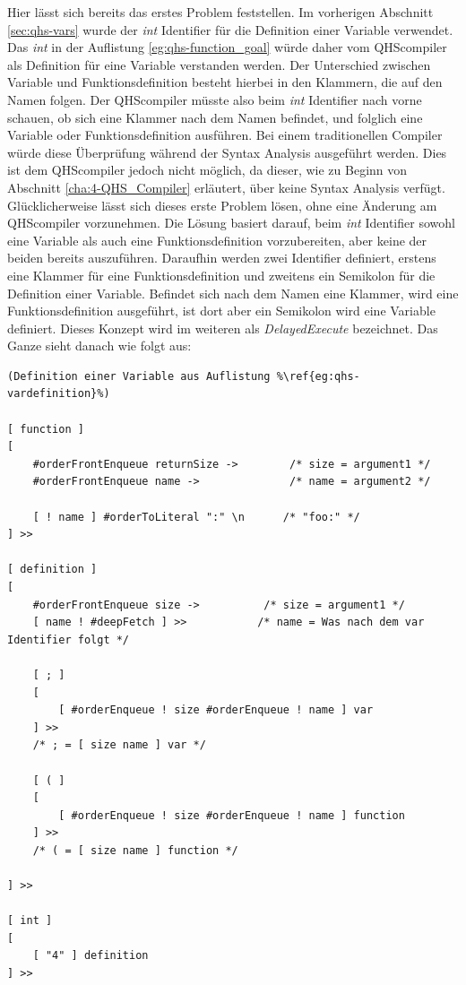 Hier lässt sich bereits das erstes Problem feststellen. Im vorherigen Abschnitt \ref{sec:qhs-vars} wurde der \textit{int} Identifier für die Definition einer Variable verwendet. 
Das \textit{int} in der Auflistung \ref{eg:qhs-function_goal} würde daher vom QHScompiler als Definition für eine Variable verstanden werden. Der Unterschied zwischen Variable und Funktionsdefinition besteht hierbei in den Klammern,
die auf den Namen folgen. Der QHScompiler müsste also beim \textit{int} Identifier nach vorne schauen, ob sich eine Klammer nach dem Namen befindet, und folglich eine Variable oder Funktionsdefinition ausführen.
Bei einem traditionellen Compiler würde diese Überprüfung während der Syntax Analysis ausgeführt werden.
Dies ist dem QHScompiler jedoch nicht möglich, da dieser, wie zu Beginn von Abschnitt \ref{cha:4-QHS_Compiler} erläutert, über keine Syntax Analysis verfügt.
Glücklicherweise lässt sich dieses erste Problem lösen, ohne eine Änderung am QHScompiler vorzunehmen.
Die Lösung basiert darauf, beim \textit{int} Identifier sowohl eine Variable als auch eine Funktionsdefinition vorzubereiten, aber keine der beiden bereits auszuführen.
Daraufhin werden zwei Identifier definiert, erstens eine Klammer für eine Funktionsdefinition und zweitens ein Semikolon für die Definition einer Variable.
Befindet sich nach dem Namen eine Klammer, wird eine Funktionsdefinition ausgeführt, ist dort aber ein Semikolon wird eine Variable definiert.
Dieses Konzept wird im weiteren als \textit{DelayedExecute} bezeichnet. Das Ganze sieht danach wie folgt aus:

\begin{minipage}{\linewidth}
\begin{lstlisting}[language=QHS, caption=Implementation eines DelayedExecute für Definitionen]
(Definition einer Variable aus Auflistung %\ref{eg:qhs-vardefinition}%)

[ function ]
[
    #orderFrontEnqueue returnSize ->        /* size = argument1 */
    #orderFrontEnqueue name ->              /* name = argument2 */

    [ ! name ] #orderToLiteral ":" \n      /* "foo:" */
] >>

[ definition ]
[
    #orderFrontEnqueue size ->          /* size = argument1 */
    [ name ! #deepFetch ] >>           /* name = Was nach dem var Identifier folgt */

    [ ; ]
    [
        [ #orderEnqueue ! size #orderEnqueue ! name ] var 
    ] >>
    /* ; = [ size name ] var */

    [ ( ]
    [
        [ #orderEnqueue ! size #orderEnqueue ! name ] function 
    ] >>
    /* ( = [ size name ] function */

] >>

[ int ]
[
    [ "4" ] definition
] >>
\end{lstlisting}
\end{minipage}



